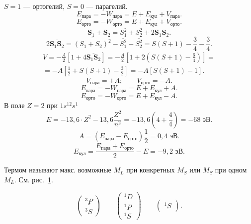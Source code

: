 \documentclass[a4paper]{article}
\begin{document}
\begin{sol}
$S=1$ --- ортогелий, $S=0$ --- парагелий.
\[
E_{\text{пара}}= - W_{\text{пара}}= E + E_\text{кул}+ V_\text{пара}
.\] 
\[
E_\text{орто}= - W_{\text{орто}}= E+E_\text{кул}+ V_{\text{орто}}
.\] 
\[
	\overline{\mathbf{S}_1+\mathbf{S}_2}= \overline{S_1^2}+
	\overline{S_2^2}+ 2 \overline{\mathbf{S}_1 \mathbf{S}_2}
.\] 
\[
	2 \overline{\mathbf{S}_1 \mathbf{S}_2}=
	\overline{(S_1+S_2)^2}- \overline{S_1^2}-\overline{S_2^2}=
	S(S+1)- \frac{3}{4}-\frac{3}{4}
.\] 
\begin{multline*}
	V= -\frac{A}{2}\left[ 1+4 \overline{\mathbf{S}_1 \mathbf{S}_2} \right]=
	-\frac{A}{2} \left[ 1+2 \left( S(S+1)-\frac{6}{4} \right)  \right] =\\=-A\left[ \frac{1}{2}+S(S+1)-\frac{3}{2} \right] =-A
	\left[ S(S+1)-1 \right] 
.\end{multline*} 
\[
V_{\text{пара}}=+A;\qquad V_\text{орто}=-A
.\] 
\[
E_{\text{пара}}= - W_{\text{пара}}= E + E_\text{кул}+ A
.\] 
\[
E_\text{орто}= - W_{\text{орто}}= E+E_\text{кул} -A
.\]
В поле $Z=2$ при $1s^12s^1$
 \[
	 E=-13,6\cdot Z^2-13,6 \frac{Z^2}{n^2}=-13,6\left( 4+
	 \frac{4}{4}\right) =-68 \text{ эВ}
.\]
\[
	A=\left( E_\text{пара}- E_\text{орто} \right) \frac{1}{2}=
	0,4 \text{ эВ}
.\] 
\[
E_\text{кул}= \frac{E_\text{пара}+E_\text{орто}}{2}-E=-9,2 \text{ эВ}
.\] 
\end{sol}
\begin{sol}
Термом называют макс. возможные $M_L$ при конкретных $M_S$
или  $M_S$ при одном $M_L$. См. рис.~\ref{fig:2}.
\begin{figure}[ht]
    \centering
    \caption{}
    \label{fig:2}
\end{figure}
\[
	\begin{pmatrix} \underline{^3P} \\ ^3 S \end{pmatrix} \qquad
	\begin{pmatrix} \underline{^1 D} \\ ^1 P \\ ^1 S \end{pmatrix} \qquad
	\begin{pmatrix} \underline{^1 S} \end{pmatrix} 
.\] 
\end{sol}
\end{document}
